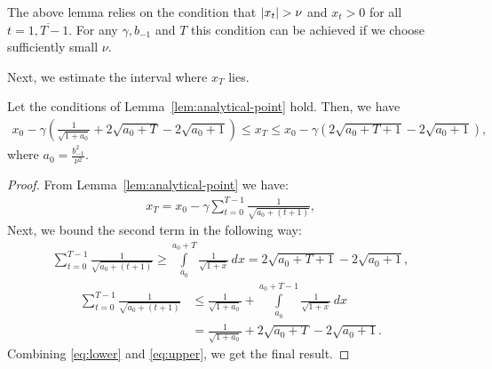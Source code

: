 \documentclass{article}
\begin{document}
The above lemma relies on the condition that $\left\lvert x_t\right\rvert > \nu$ and $x_t > 0$ for all $t=\overline{1, T-1}$. For any $\gamma, b_{-1}$ and $T$ this condition can be achieved if we choose sufficiently small $\nu$.


Next, we estimate the interval where $x_T$ lies.

\begin{lemma}\label{lem:iter-bounds-huber}
Let the conditions of Lemma~\ref{lem:analytical-point} hold. Then, we have
    \begin{align*}
        x_0 - \gamma \left(\frac{1}{\sqrt{1 + a_0}} + 2\sqrt{a_0 + T} - 2\sqrt{a_0 + 1}\right) \leq x_T \leq x_0 - \gamma \left(2\sqrt{a_0 + T + 1} - 2\sqrt{a_0 + 1}\right),
    \end{align*}
    where $a_0 = \frac{b_{-1}^2}{\nu^2}$.
\end{lemma}
\begin{proof}
    From Lemma~\ref{lem:analytical-point} we have:
    \begin{align*}
        x_T = x_0 - \gamma\sum\limits_{t = 0}^{T-1}\frac{1}{\sqrt{a_0 + (t+1)}},
    \end{align*}
      Next, we bound the second term in the following way:
    \begin{align}
    \label{eq:lower}
        \sum\limits_{t = 0}^{T-1}\frac{1}{\sqrt{a_0 + (t+1)}} \geq \int\limits_{a_0}^{a_0 + T}\frac{1}{\sqrt{1 + x}}\,dx = 2\sqrt{a_0 + T + 1} - 2\sqrt{a_0 + 1}, 
    \end{align}
    \begin{align}
    \label{eq:upper}
        \sum\limits_{t = 0}^{T-1}\frac{1}{\sqrt{a_0 + (t+1)}} &\leq \frac{1}{\sqrt{1 + a_0}} + \int\limits_{a_0}^{a_0 + T - 1}\frac{1}{\sqrt{1 + x}}\,dx \nonumber\\&= \frac{1}{\sqrt{1 + a_0}} + 2\sqrt{a_0 + T} - 2\sqrt{a_0 + 1}.
    \end{align}
    Combining \eqref{eq:lower} and \eqref{eq:upper}, we get the final result.
\end{proof}
\end{document}
